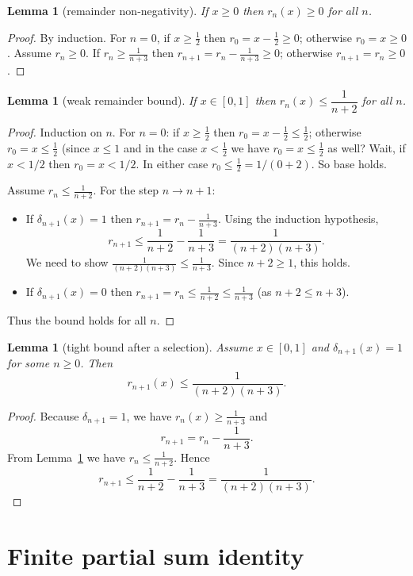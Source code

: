 \documentclass[11pt,a4paper]{article}
\newtheorem{lemma}[theorem]{Lemma}
\theoremstyle{definition}
\theoremstyle{remark}
\begin{document}
\begin{lemma}[remainder non‑negativity]\label{lem:rem_nonneg}
If \(x\ge0\) then \(r_n(x)\ge0\) for all \(n\).
\end{lemma}
\begin{proof}
By induction. For \(n=0\), if \(x\ge\frac12\) then \(r_0=x-\frac12\ge0\); otherwise \(r_0=x\ge0\).
Assume \(r_n\ge0\). If \(r_n \ge \frac1{n+3}\) then \(r_{n+1}=r_n-\frac1{n+3}\ge0\); otherwise \(r_{n+1}=r_n\ge0\).
\end{proof}

\begin{lemma}[weak remainder bound]\label{lem:rem_weak}
If \(x\in[0,1]\) then \(r_n(x)\le \dfrac1{n+2}\) for all \(n\).
\end{lemma}
\begin{proof}
Induction on \(n\). For \(n=0\): if \(x\ge\frac12\) then \(r_0 = x-\frac12 \le \frac12\); otherwise \(r_0=x\le \frac12\) (since \(x\le1\) and in the case \(x<\frac12\) we have \(r_0=x\le\frac12\) as well? Wait, if \(x<1/2\) then \(r_0=x<1/2\). In either case \(r_0\le\frac12 = 1/(0+2)\). So base holds.

Assume \(r_n \le \frac1{n+2}\). For the step \(n\to n+1\):
\begin{itemize}
\item If \(\delta_{n+1}(x)=1\) then \(r_{n+1}=r_n - \frac1{n+3}\). Using the induction hypothesis,
\[
r_{n+1}\le \frac1{n+2} - \frac1{n+3} = \frac{1}{(n+2)(n+3)}.
\]
We need to show \(\frac1{(n+2)(n+3)}\le \frac1{n+3}\). Since \(n+2\ge1\), this holds.
\item If \(\delta_{n+1}(x)=0\) then \(r_{n+1}=r_n\le \frac1{n+2} \le \frac1{n+3}\) (as \(n+2\le n+3\)).
\end{itemize}
Thus the bound holds for all \(n\).
\end{proof}

\begin{lemma}[tight bound after a selection]\label{lem:rem_tight}
Assume \(x\in[0,1]\) and \(\delta_{n+1}(x)=1\) for some \(n\ge0\). Then
\[
r_{n+1}(x) \le \frac{1}{(n+2)(n+3)}.
\]
\end{lemma}
\begin{proof}
Because \(\delta_{n+1}=1\), we have \(r_n(x)\ge \frac1{n+3}\) and
\[
r_{n+1}=r_n - \frac1{n+3}.
\]
From Lemma~\ref{lem:rem_weak} we have \(r_n\le \frac1{n+2}\). Hence
\[
r_{n+1} \le \frac1{n+2} - \frac1{n+3} = \frac{1}{(n+2)(n+3)}.
\]
\end{proof}

\section{Finite partial sum identity}
\end{document}
